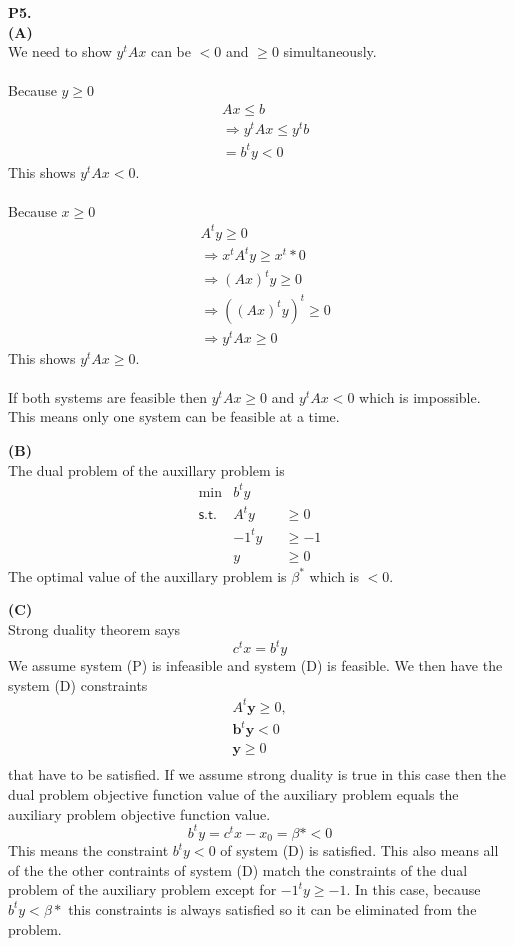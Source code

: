 \documentclass[11pt]{article}
\begin{document}
\bigskip

\noindent\textbf{P5.}
\\
\noindent\textbf{(A)}
\\
We need to show $y^tAx$ can be $<0$ and $\geq 0$ simultaneously.\\
\\
Because $y \geq 0$
\begin{align*}
&Ax \leq b \\
&\Rightarrow y^tAx \leq y^tb \\
&= b^ty < 0
\end{align*}
This shows $y^tAx < 0$.\\
\\
Because $x \geq 0$
\begin{align*}
&A^ty \geq 0 \\
&\Rightarrow x^tA^ty \geq x^t*0\\
&\Rightarrow (Ax)^ty \geq 0 \\
&\Rightarrow ((Ax)^ty)^t \geq 0 \\
&\Rightarrow y^tAx \geq 0
\end{align*}
This shows $y^tAx \geq 0$.\\
\\ 
If both systems are feasible then $y^tAx \geq 0$ and $y^tAx < 0$ which is impossible.  This means only one system can be feasible at a time. 
\medskip

\noindent\textbf{(B)}
\\
The dual problem of the auxillary problem is
\[ \begin{array}{rlll}
\min & b^ty \\
\mathsf{s.t.} 
& A^ty &  & \geq 0 \\
& -1^ty & & \geq -1 \\
& y & & \geq 0
\end{array}\]
The optimal value of the auxillary problem is $\beta^*$ which is $< 0$.

\medskip

\noindent\textbf{(C)}
\\
Strong duality theorem says
\[
c^tx = b^ty
\]
We assume system (P) is infeasible and system (D) is feasible.  We then have the system (D) constraints
\[ \begin{array}{l}
A^t \mathbf{y} \geq 0,\\
\mathbf{b}^t \mathbf{y} < 0\\
\mathbf{y} \geq 0 \\
\end{array}\]
that have to be satisfied.  If we assume strong duality is true in this case then the dual problem objective function value of the auxiliary problem equals the auxiliary problem objective function value.
\[
b^ty = c^tx - x_0 = \beta* < 0
\]
This means the constraint $b^ty < 0$ of system (D) is satisfied.  This also means all of the the other contraints of system (D) match the constraints of the dual problem of the auxiliary problem except for $-1^ty \geq -1$.  In this case, because $b^ty < \beta*$ this constraints is always satisfied so it can be eliminated from the problem.
\end{document}
